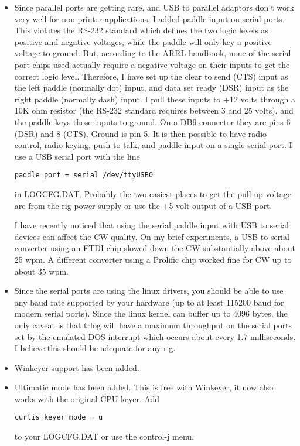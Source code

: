 \documentclass[12pt]{article}
\begin{document}
\begin{itemize}
\item
Since parallel ports are getting rare, and USB to parallel adaptors
don't work very well for non printer applications, I added paddle
input on serial ports.
This violates the RS-232 standard which defines
the two logic levels as positive and negative voltages, while the
paddle will only key a positive voltage to ground. But, according
to the ARRL
handbook, none of the serial port chips used actually require
a negative voltage on their inputs to get the correct logic level.
Therefore, I have set up the clear to send (CTS) input as the left
paddle (normally dot) input, and data set ready (DSR) input as the
right paddle (normally dash) input. I pull these inputs to +12 volts through
a 10K ohm resistor (the RS-232 standard requires between 3 and 25 volts),
and the paddle keys those inputs to ground. On a DB9 connector they
are pins 6 (DSR) and 8 (CTS). Ground is pin 5. It is then possible
to have radio control, radio keying, push to talk, and paddle input
on a single serial port. I use a USB serial port with the line
\begin{verbatim}
paddle port = serial /dev/ttyUSB0
\end{verbatim}
in LOGCFG.DAT. Probably the two easiest places to get the pull-up voltage
are from the rig power supply or use the +5 volt output of a USB port.

I have recently noticed that using the serial paddle input with
USB to serial devices can affect the CW quality. On my brief experiments,
a USB to serial converter using an FTDI chip slowed down the CW substantially
above about 25 wpm. A different converter using a Prolific chip worked
fine for CW up to about 35 wpm.

\item
Since the serial ports are using the linux drivers, you should
be able to use
any baud rate
supported by your hardware (up to at least 115200 baud
for modern serial ports). Since the linux kernel can buffer up
to 4096 bytes, the only caveat is that trlog will have a maximum throughput
on the serial ports set by the emulated DOS interrupt which
occurs about every 1.7 milliseconds. I believe this should be adequate for
any rig.

\item
Winkeyer support has been added.

\item
Ultimatic mode has been added.
This is free with Winkeyer, it now also
works with the original CPU keyer.
Add
\begin{verbatim}
curtis keyer mode = u
\end{verbatim}
to your LOGCFG.DAT or use the control-j menu.


\end{itemize}
\end{document}
